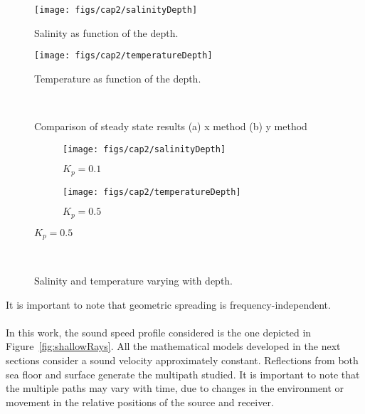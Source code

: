 \begin{figure}[!h]
	\centering
	\texttt{[image: figs/cap2/salinityDepth]}
	\caption{Salinity as function of the depth.}
	\label{fig:salinitydepth}
\end{figure}

\begin{figure}[!h]
	\centering
	\texttt{[image: figs/cap2/temperatureDepth]}
	\caption{Temperature as function of the depth.}
	\label{fig:temperaturedepth}
\end{figure}

\begin{figure}[!h]
	\centering
	\label{fig:star}
	~
	\label{fig:star10_zf}
	\caption{Comparison of steady state results (a) x method (b) y method}
\end{figure}

\begin{figure}[!h]
	\centering
	\begin{subfigure}[b]{0.48\textwidth}
		\texttt{[image: figs/cap2/salinityDepth]}
		\label{fig:salinityDepth}
		\caption{$K_{p} = 0.1$}
	\end{subfigure}
	\quad
	\begin{subfigure}[b]{0.48\textwidth}
		\texttt{[image: figs/cap2/temperatureDepth]}
		\caption{$K_{p} = 0.5$}
		\label{fig:temperatureDepth}
	\end{subfigure}
\end{figure}


\begin{figure}[!h]
	\centering
	~
	\caption{Salinity and temperature varying with depth.}
\end{figure}

It is important to note that geometric spreading is frequency-independent.

\paragraph{}In this work, the sound speed profile considered is the one depicted in Figure~\ref{fig:shallowRays}. All the mathematical models developed in the next sections consider a sound velocity approximately constant. Reflections from both sea floor and surface generate the multipath studied. It is important to note that the multiple paths may vary with time, due to changes in the environment or movement in the relative positions of the source and receiver. 


